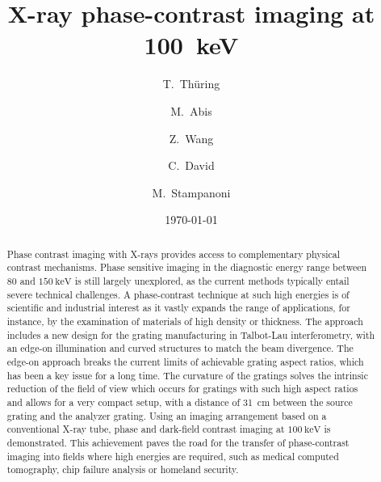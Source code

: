\documentclass[aps,prl,preprint]{revtex4-1}
\begin{document}
\title{X-ray phase-contrast imaging at \SI{100}{\kilo\electronvolt}}

\author{T.~Thüring}
\author{M.~Abis}
\author{Z.~Wang}
\author{C.~David}
\author{M.~Stampanoni}

\date{\today}


\begin{abstract}
    Phase contrast imaging with X-rays provides access to
    complementary physical contrast mechanisms. Phase sensitive imaging in
    the diagnostic energy range between $80$ and
    $\SI{150}{\kilo\electronvolt}$ is still largely unexplored, as the
    current methods typically entail severe technical challenges. A
    phase-contrast technique at such high energies is of scientific and
    industrial interest as it vastly expands the range of applications, for
    instance, by the examination of materials of high density or thickness.
    The approach includes a new design for the grating manufacturing in
    Talbot-Lau interferometry, with an edge-on illumination and curved
    structures to match the beam divergence. The edge-on approach breaks the
    current limits of achievable grating aspect ratios, which has been a key
    issue for a long time. The curvature of the gratings solves the
    intrinsic reduction of the field of view which occurs for gratings with
    such high aspect ratios and allows for a very compact setup, with a
    distance of \SI{31}{\centi\metre} between the source grating and the
    analyzer grating. Using an imaging arrangement based on a
    conventional X-ray tube, phase and dark-field contrast imaging at
    $\SI{100}{\kilo\electronvolt}$ is demonstrated. This achievement paves
    the road for the transfer of phase-contrast imaging into fields where
    high energies are required, such as medical computed tomography, chip
    failure analysis or homeland security.
\end{abstract}
\end{document}
